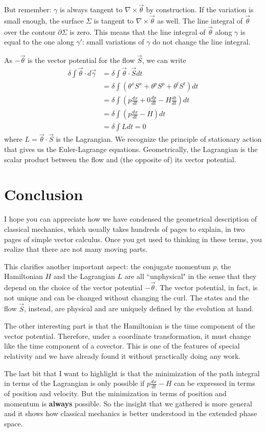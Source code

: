 \documentclass[aps,pra,10pt,floatfix,nofootinbib]{revtex4-1}
\theoremstyle{definition}
\begin{document}
But remember: $\gamma$ is always tangent to $\nabla \times \vec{\theta}$ by construction. If the variation is small enough, the surface $\Sigma$ is tangent to $\nabla \times \vec{\theta}$ as well. The line integral of $\vec{\theta}$ over the contour $\partial \Sigma$ is zero. This means that the line integral of $\vec{\theta}$ along $\gamma$ is equal to the one along $\gamma'$: small variations of $\gamma$ do not change the line integral.

As $-\vec{\theta}$ is the vector potential for the flow $\vec{S}$, we can write
\begin{equation}
\begin{aligned}
\delta \int \vec{\theta} \cdot d\vec{\gamma} &= \delta \int \vec{\theta} \cdot \vec{S} dt \\
&= \delta \int (\theta^x S^x + \theta ^p S^p + \theta^t S^t)dt \\
&= \delta \int \left( p \frac{dx}{dt} + 0 \frac{dp}{dt} - H \frac{dt}{dt} \right)dt \\
&= \delta \int \left( p \frac{dx}{dt} - H  \right)dt \\
&= \delta \int L dt =  0
\end{aligned}
\label{stationaryAction}
\end{equation}
where $L= \vec{\theta} \cdot \vec{S}$ is the Lagrangian. We recognize the principle of stationary action that gives us the Euler-Lagrange equations. Geometrically, the Lagrangian is the scalar product between the flow and (the opposite of) its vector potential.

\section{Conclusion}

I hope you can appreciate how we have condensed the geometrical description of classical mechanics, which usually takes hundreds of pages to explain, in two pages of simple vector calculus. Once you get used to thinking in these terms, you realize that there are not many moving parts.

This clarifies another important aspect: the conjugate momentum $p$, the Hamiltonian $H$ and the Lagrangian $L$ are all ``unphysical" in the sense that they depend on the choice of the vector potential $-\vec{\theta}$. The vector potential, in fact, is not unique and can be changed without changing the curl. The states and the flow $\vec{S}$, instead, are physical and are uniquely defined by the evolution at hand.

The other interesting part is that the Hamiltonian is the time component of the vector potential. Therefore, under a coordinate transformation, it must change like the time component of a covector. This is one of the features of special relativity and we have already found it without practically doing any work.

The last bit that I want to highlight is that the minimization of the path integral in terms of the Lagrangian is only possible if $p \frac{dx}{dt} - H$ can be expressed in terms of position and velocity. But the minimization in terms of position and momentum is \textbf{always} possible. So the insight that we gathered is more general and it shows how classical mechanics is better understood in the extended phase space.
\end{document}

